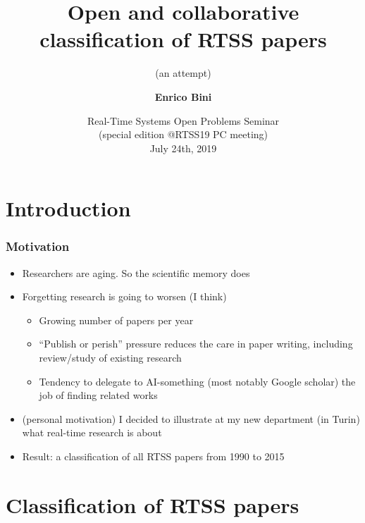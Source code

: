 \documentclass[ignorenonframetext,mathserif]{beamer} %
\title[Classification of RTSS papers]
{Open and collaborative classification of RTSS papers}
\subtitle{(an attempt)}
\author[E. Bini]{\textbf{Enrico Bini}}
\institute[UniTo, Torino, Italy]{University of Turin}
\date[RTSOPS'19, 24/07/2019]{Real-Time Systems Open Problems Seminar\\
{\small (special edition @RTSS19 PC meeting)}\\ July 24th, 2019}
\begin{document}
\begin{frame}
  \titlepage
\end{frame}





\section{Introduction}

\begin{frame}
  \frametitle{Motivation}
  \begin{itemize}
  \item Researchers are aging. So the scientific memory does
  \item Forgetting research is going to worsen (I think)
    \begin{itemize}
    \item Growing number of papers per year
    \item ``Publish or perish'' pressure reduces the care in paper
      writing, including review/study of existing research
    \item Tendency to delegate to AI-something (most notably Google
      scholar) the job of finding related works
    \end{itemize}
  \item (personal motivation) I decided to illustrate at my new
    department (in Turin) what real-time research is about
  \item Result: a classification of all RTSS papers from 1990 to 2015
  \end{itemize}
\end{frame}

\section{Classification of RTSS papers}
\end{document}

